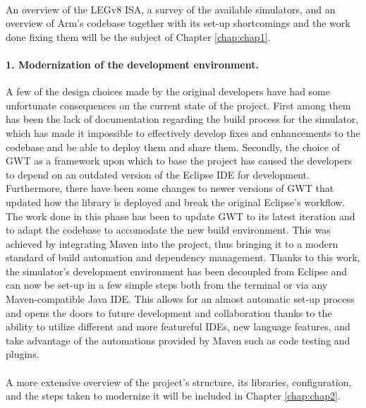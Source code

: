 \paragraph{}
An overview of the LEGv8 ISA, a survey of the available simulators, and an overview of Arm's codebase together with its set-up shortcomings and the work done fixing them will be the subject of Chapter \ref{chap:chap1}.

\paragraph{1. Modernization of the development environment.}
A few of the design choices made by the original developers have had some unfortunate consequences on the current state of the project. First among them has been the lack of documentation regarding the build process for the simulator, which has made it impossible to effectively develop fixes and enhancements to the codebase and be able to deploy them and share them. Secondly, the choice of GWT as a framework upon which to base the project has caused the developers to depend on an outdated version of the Eclipse IDE for development. Furthermore, there have been some changes to newer versions of GWT that updated how the library is deployed and break the original Eclipse's workflow.\\
The work done in this phase has been to update GWT to its latest iteration and to adapt the codebase to accomodate the new build environment. This was achieved by integrating Maven \cite{mavenweb} into the project, thus bringing it to a modern standard of build automation and dependency management. Thanks to this work, the simulator's development environment has been decoupled from Eclipse and can now be set-up in a few simple steps both from the terminal or via any Maven-compatible Java IDE. This allows for an almost automatic set-up process and opens the doors to future development and collaboration thanks to the ability to utilize different and more featureful IDEs, new language features, and take advantage of the automations provided by Maven such as code testing and plugins.

\paragraph{}
A more extensive overview of the project's structure, its libraries, configuration, and the steps taken to modernize it will be included in Chapter \ref{chap:chap2}.

